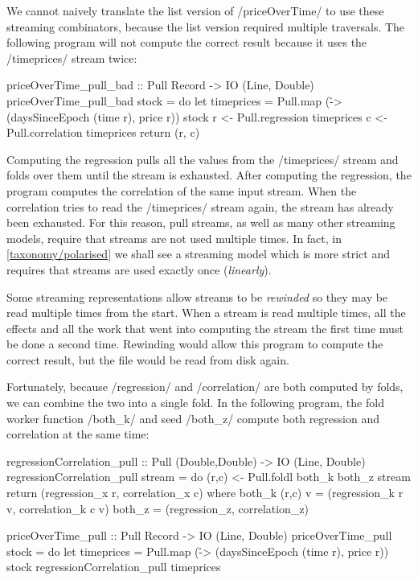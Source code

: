 We cannot naively translate the list version of \Hs/priceOverTime/ to use these streaming combinators, because the list version required multiple traversals.
The following program will not compute the correct result because it uses the \Hs/timeprices/ stream twice:

\begin{haskell}
priceOverTime_pull_bad :: Pull Record -> IO (Line, Double)
priceOverTime_pull_bad stock = do
  let timeprices = Pull.map (\r -> (daysSinceEpoch (time r), price r)) stock
  r <- Pull.regression  timeprices
  c <- Pull.correlation timeprices
  return (r, c)
\end{haskell}

Computing the regression pulls all the values from the \Hs/timeprices/ stream and folds over them until the stream is exhausted.
After computing the regression, the program computes the correlation of the same input stream.
When the correlation tries to read the \Hs/timeprices/ stream again, the stream has already been exhausted.
For this reason, pull streams, as well as many other streaming models, require that streams are not used multiple times.
In fact, in \cref{taxonomy/polarised} we shall see a streaming model which is more strict and requires that streams are used exactly once (\emph{linearly}).

Some streaming representations allow streams to be \emph{rewinded} so they may be read multiple times from the start.
When a stream is read multiple times, all the effects and all the work that went into computing the stream the first time must be done a second time.
Rewinding would allow this program to compute the correct result, but the file would be read from disk again.

Fortunately, because \Hs/regression/ and \Hs/correlation/ are both computed by folds, we can combine the two into a single fold.
In the following program, the fold worker function \Hs/both_k/ and seed \Hs/both_z/ compute both regression and correlation at the same time:
\newpage

\begin{haskell}
regressionCorrelation_pull :: Pull (Double,Double) -> IO (Line, Double)
regressionCorrelation_pull stream = do
  (r,c) <- Pull.foldl both_k both_z stream
  return (regression_x r, correlation_x c)
 where
  both_k (r,c) v = (regression_k r v, correlation_k c v)
  both_z         = (regression_z,     correlation_z)

priceOverTime_pull :: Pull Record -> IO (Line, Double)
priceOverTime_pull stock = do
  let timeprices = Pull.map (\r -> (daysSinceEpoch (time r), price r)) stock
  regressionCorrelation_pull timeprices
\end{haskell}


